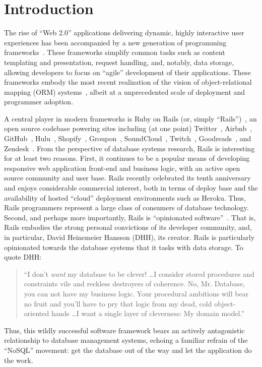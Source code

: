 
\section{Introduction}
\label{sec:intro}

The rise of ``Web 2.0'' applications delivering dynamic, highly
interactive user experiences has been accompanied by a new generation
of programming frameworks~\cite{web20}. These frameworks simplify
common tasks such as content templating and presentation, request
handling, and, notably, data storage, allowing developers to focus on
``agile'' development of their applications. These frameworks embody
the most recent realization of the vision of object-relational mapping
(ORM) systems~\cite{orm-db}, albeit at a unprecedented scale of deployment and
programmer adoption.

A central player in modern frameworks is Ruby on Rails (or, simply
``Rails'')~\cite{rails-book,rails-computer}, an open source codebase
powering sites including (at one point) Twitter~\cite{twitter-rails},
Airbnb~\cite{airbnb-rails}, GitHub~\cite{github-rails},
Hulu~\cite{hulu-rails}, Shopify~\cite{shopify-rails},
Groupon~\cite{groupon-rails}, SoundCloud~\cite{soundcloud-rails},
Twitch~\cite{twitch-rails}, Goodreads~\cite{goodreads-rails}, and
Zendesk~\cite{zendesk-rails}. From the perspective of database systems
research, Rails is interesting for at least two reasons. First, it
continues to be a popular means of developing responsive web
application front-end and business logic, with an active open source
community and user base. Rails recently celebrated its tenth
anniversary and enjoys considerable commercial interest, both in terms
of deploy base and the availability of hosted ``cloud'' deployment
environments such as Heroku. Thus, Rails programmers represent a large
class of consumers of database technology. Second, and perhaps more
importantly, Rails is ``opinionated
software''~\cite{dhh-opinionated}. That is, Rails embodies the strong
personal convictions of its developer community, and, in particular,
David Heinemeier Hansson (DHH), its creator. Rails is particularly
opinionated towards the database systems that it tasks with data
storage. To quote DHH:
\begin{quote}
``I don't \textit{want} my database to be clever! \dots I consider stored procedures and constraints vile and reckless destroyers of coherence. No, Mr. Database, you can not have my business logic. Your procedural ambitions will bear no fruit and you'll have to pry that logic from my dead, cold object-oriented hands \dots I want a single layer of cleverness: My domain model.''~\cite{dhh-clever}
\end{quote}
Thus, this wildly successful software framework bears an actively
antagonistic relationship to database management systems, echoing a familiar refrain of the ``NoSQL'' movement: get the database out of the way and let the application do the work.

